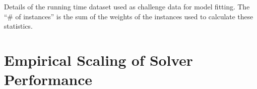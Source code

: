 \begin{table*}
\noindent \begin{centering}

\par\end{centering}

\caption{\label{tab:Details-dataset-challenge} Details of the running time
dataset used as challenge data for model fitting.
 The ``\# of instances'' is the
sum of the weights of the instances used to calculate these statistics.}
\end{table*}

%
%
%
%

\section{Empirical Scaling of Solver Performance}

\label{sec:Results}

